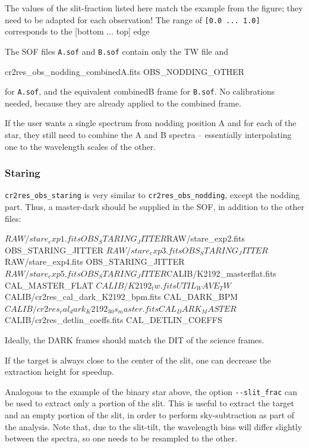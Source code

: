 The values of the slit-fraction listed here match the example from the figure;
they need to be adapted for each observation! The range of \verb![0.0 ... 1.0]!
corresponds to the [bottom ... top] edge 

The SOF files \verb!A.sof! and \verb!B.sof! contain only the TW file and
\begin{shell}[fontsize=\small]
    cr2res_obs_nodding_combinedA.fits OBS_NODDING_OTHER
\end{shell}
for \verb!A.sof!, and the equivalent combinedB frame for \verb!B.sof!.
No calibrations needed, because they are already applied to the combined frame.

If the user wants a single spectrum from nodding position A and for each of the
star, they still need to combine the A and B spectra -- essentially interpolating
one to the wavelength scales of the other.

\subsubsection{Staring}

\verb!cr2res_obs_staring! is very similar to \verb!cr2res_obs_nodding!, except
the nodding part. Thus, a master-dark should be supplied in the SOF, in addition
to the other files:
\begin{shell}[fontsize=\small]
$RAW/stare_exp1.fits        OBS_STARING_JITTER
$RAW/stare_exp2.fits        OBS_STARING_JITTER
$RAW/stare_exp3.fits        OBS_STARING_JITTER
$RAW/stare_exp4.fits        OBS_STARING_JITTER
$RAW/stare_exp5.fits        OBS_STARING_JITTER
$CALIB/K2192_masterflat.fits                  CAL_MASTER_FLAT
$CALIB/K2192_tw.fits                          UTIL_WAVE_TW
$CALIB/cr2res_cal_dark_K2192_bpm.fits         CAL_DARK_BPM
$CALIB/cr2res_cal_dark_K2192_30s_master.fits  CAL_DARK_MASTER
$CALIB/cr2res_detlin_coeffs.fits              CAL_DETLIN_COEFFS
\end{shell}  
Ideally, the DARK frames should match the DIT of the science frames.

If the target is always close to the center of the slit, one can decrease the extraction height for speedup.
\begin{shell}[fontsize=\small]
\end{shell}  

Analogous to the example of the binary star above, the option \verb!--slit_frac!
can be used to extract only a portion of the slit. This is useful to extract the
target and an empty portion of the slit, in order to perform sky-subtraction as
part of the analysis. Note that, due to the slit-tilt, the wavelength bins will
differ slightly between the spectra, so one needs to be resampled to the other.

